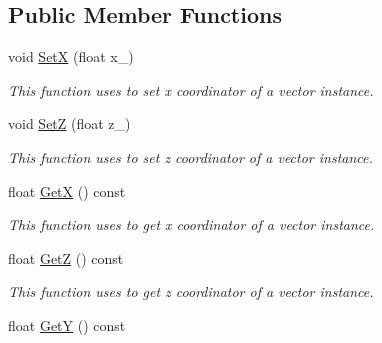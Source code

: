 \subsection*{Public Member Functions}
\begin{DoxyCompactItemize}
\item 
\mbox{\label{classcsci3081_1_1Vector_a25668daef8abbefe545400b61370e465}} 
void \hyperlink{classcsci3081_1_1Vector_a25668daef8abbefe545400b61370e465}{SetX} (float x\+\_\+)
\begin{DoxyCompactList}\small\item\em This function uses to set x coordinator of a vector instance. \end{DoxyCompactList}\item 
\mbox{\label{classcsci3081_1_1Vector_ade27e84fb7cfc517d10982a231cf1514}} 
void \hyperlink{classcsci3081_1_1Vector_ade27e84fb7cfc517d10982a231cf1514}{SetZ} (float z\+\_\+)
\begin{DoxyCompactList}\small\item\em This function uses to set z coordinator of a vector instance. \end{DoxyCompactList}\item 
\mbox{\label{classcsci3081_1_1Vector_a22a861b6ac42caa61304da2f291eccff}} 
float \hyperlink{classcsci3081_1_1Vector_a22a861b6ac42caa61304da2f291eccff}{GetX} () const
\begin{DoxyCompactList}\small\item\em This function uses to get x coordinator of a vector instance. \end{DoxyCompactList}\item 
\mbox{\label{classcsci3081_1_1Vector_a3e4a88cae4754e20f214a3029a8831dd}} 
float \hyperlink{classcsci3081_1_1Vector_a3e4a88cae4754e20f214a3029a8831dd}{GetZ} () const
\begin{DoxyCompactList}\small\item\em This function uses to get z coordinator of a vector instance. \end{DoxyCompactList}\item 
\mbox{\label{classcsci3081_1_1Vector_aeefa39719f335e798a9475f7f9cf8ca7}} 
float \hyperlink{classcsci3081_1_1Vector_aeefa39719f335e798a9475f7f9cf8ca7}{GetY} () const

\end{DoxyCompactItemize}
